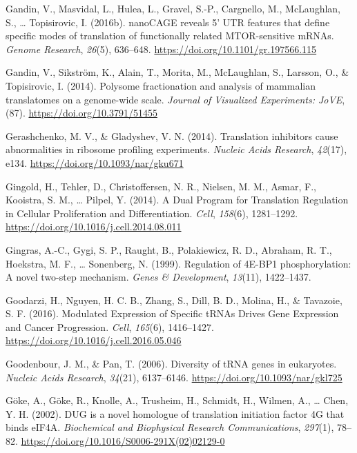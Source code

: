 \documentclass[12pt,openany]{book}
\begin{document}
\hypertarget{ref-Gandin2016a}{}
Gandin, V., Masvidal, L., Hulea, L., Gravel, S.-P., Cargnello, M.,
McLaughlan, S., \ldots{} Topisirovic, I. (2016b). nanoCAGE reveals 5'
UTR features that define specific modes of translation of functionally
related MTOR-sensitive mRNAs. \emph{Genome Research}, \emph{26}(5),
636--648. \url{https://doi.org/10.1101/gr.197566.115}

\hypertarget{ref-Gandin2014}{}
Gandin, V., Sikström, K., Alain, T., Morita, M., McLaughlan, S.,
Larsson, O., \& Topisirovic, I. (2014). Polysome fractionation and
analysis of mammalian translatomes on a genome-wide scale. \emph{Journal
of Visualized Experiments: JoVE}, (87).
\url{https://doi.org/10.3791/51455}

\hypertarget{ref-Gerashchenko2014}{}
Gerashchenko, M. V., \& Gladyshev, V. N. (2014). Translation inhibitors
cause abnormalities in ribosome profiling experiments. \emph{Nucleic
Acids Research}, \emph{42}(17), e134.
\url{https://doi.org/10.1093/nar/gku671}

\hypertarget{ref-Gingold2014}{}
Gingold, H., Tehler, D., Christoffersen, N. R., Nielsen, M. M., Asmar,
F., Kooistra, S. M., \ldots{} Pilpel, Y. (2014). A Dual Program for
Translation Regulation in Cellular Proliferation and Differentiation.
\emph{Cell}, \emph{158}(6), 1281--1292.
\url{https://doi.org/10.1016/j.cell.2014.08.011}

\hypertarget{ref-Gingras1999}{}
Gingras, A.-C., Gygi, S. P., Raught, B., Polakiewicz, R. D., Abraham, R.
T., Hoekstra, M. F., \ldots{} Sonenberg, N. (1999). Regulation of 4E-BP1
phosphorylation: A novel two-step mechanism. \emph{Genes \&
Development}, \emph{13}(11), 1422--1437.

\hypertarget{ref-Goodarzi2016}{}
Goodarzi, H., Nguyen, H. C. B., Zhang, S., Dill, B. D., Molina, H., \&
Tavazoie, S. F. (2016). Modulated Expression of Specific tRNAs Drives
Gene Expression and Cancer Progression. \emph{Cell}, \emph{165}(6),
1416--1427. \url{https://doi.org/10.1016/j.cell.2016.05.046}

\hypertarget{ref-Goodenbour2006}{}
Goodenbour, J. M., \& Pan, T. (2006). Diversity of tRNA genes in
eukaryotes. \emph{Nucleic Acids Research}, \emph{34}(21), 6137--6146.
\url{https://doi.org/10.1093/nar/gkl725}

\hypertarget{ref-Goke2002}{}
Göke, A., Göke, R., Knolle, A., Trusheim, H., Schmidt, H., Wilmen, A.,
\ldots{} Chen, Y. H. (2002). DUG is a novel homologue of translation
initiation factor 4G that binds eIF4A. \emph{Biochemical and Biophysical
Research Communications}, \emph{297}(1), 78--82.
\url{https://doi.org/10.1016/S0006-291X(02)02129-0}
\end{document}
